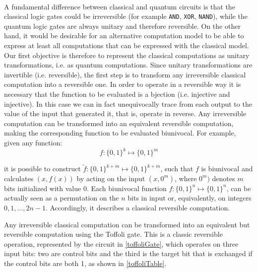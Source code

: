 \documentclass[a4paper,10pt]{article}
\begin{document}
\paragraph{} A fundamental difference between classical and quantum circuits is that the classical logic gates could be irreversible (for example \texttt{AND}, \texttt{XOR}, \texttt{NAND}), while the quantum logic gates are always unitary and therefore reversible. On the other hand, it would be desirable for an alternative computation model to be able to express at least all computations that can be expressed with the classical model. Our first objective is therefore to represent the classical computations as unitary transformations, i.e. as quantum computations. Since unitary transformations are invertible (i.e. reversible), the first step is to transform any irreversible classical computation into a reversible one. In order to operate in a reversible way it is necessary that the function to be evaluated is a bjection (i.e. injective and injective). In this case we can in fact unequivocally trace from each output to the value of the input that generated it, that is, operate in reverse. Any irreversible computation can be transformed into an equivalent reversible computation, making the corresponding function to be evaluated biunivocal. For example, given any function:
$$f : \{0, 1\}^{k} \mapsto \{0, 1\}^{m}$$

it is possible to construct $\widetilde{f} : \{0, 1\}^{k+m} \mapsto \{0, 1\}^{k+m}$, such that $f$ is biunivocal and calculates $(x, f(x))$ by acting on the input $(x, 0^{m})$, where $0^{m})$ denotes $m$ bits initialized with value $0$. Each biunivocal function $f : \{0, 1\}^{n} \mapsto \{0, 1\}^{n}$, can be actually seen as a permutation on the $n$ bits in input or, equivalently, on integers $0, 1, \ldots, 2n - 1$. Accordingly, it describes a classical reversible computation.

Any irreversible classical computation can be transformed into an equivalent but reversible computation using the Toffoli gate. This is a classic reversible operation, represented by the circuit in \autoref{toffoliGate}, which operates on three input bits: two are control bits and the third is the target bit that is exchanged if the control bits are both 1, as shown in \autoref{toffoliTable}.
\end{document}
